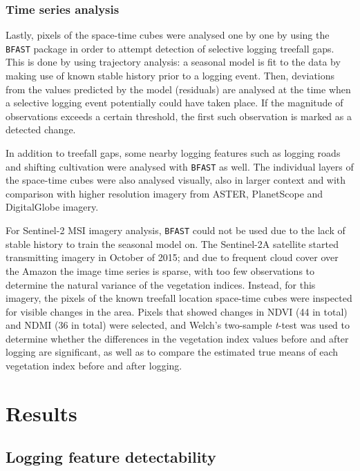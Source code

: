 \documentclass[a4paper,12pt]{scrbook}
\begin{document}
\subsection{Time series analysis}

Lastly, pixels of the space-time cubes were analysed one by one by using the \texttt{BFAST} package \citep{verbesselt_detecting_2010} in order to attempt detection of selective logging treefall gaps. This is done by using trajectory analysis: a seasonal model is fit to the data by making use of known stable history prior to a logging event. Then, deviations from the values predicted by the model (residuals) are analysed at the time when a selective logging event potentially could have taken place. If the magnitude of observations exceeds a certain threshold, the first such observation is marked as a detected change.

In addition to treefall gaps, some nearby logging features such as logging roads and shifting cultivation were analysed with \texttt{BFAST} as well. The individual layers of the space-time cubes were also analysed visually, also in larger context and with comparison with higher resolution imagery from \ac{ASTER}, PlanetScope and DigitalGlobe imagery.

For Sentinel-2 \ac{MSI} imagery analysis, \texttt{BFAST} could not be used due to the lack of stable history to train the seasonal model on. The Sentinel-2A satellite started transmitting imagery in October of 2015; and due to frequent cloud cover over the Amazon the image time series is sparse, with too few observations to determine the natural variance of the vegetation indices. Instead, for this imagery, the pixels of the known treefall location space-time cubes were inspected for visible changes in the area. Pixels that showed changes in NDVI (44 in total) and NDMI (36 in total) were selected, and Welch's two-sample \textit{t}-test was used to determine whether the differences in the vegetation index values before and after logging are significant, as well as to compare the estimated true means of each vegetation index before and after logging.

\chapter{Results}

\section{Logging feature detectability}
\end{document}
